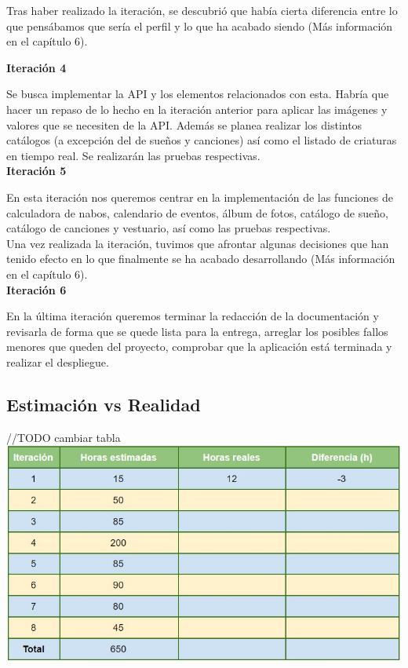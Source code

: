 Tras haber realizado la iteración, se descubrió que había cierta diferencia entre lo que pensábamos que sería el perfil y lo que ha acabado siendo (Más información en el capítulo 6).\\

\clearpage

\textbf{Iteración 4}

Se busca implementar la API y los elementos relacionados con esta. Habría que hacer un repaso de lo hecho en la iteración anterior para aplicar las imágenes y valores que se necesiten de la API. Además se planea realizar los distintos catálogos (a excepción del de sueños y canciones) así como el listado de criaturas en tiempo real. Se realizarán las pruebas respectivas.\\

\textbf{Iteración 5}

En esta iteración nos queremos centrar en la implementación de las funciones de calculadora de nabos, calendario de eventos, álbum de fotos, catálogo de sueño, catálogo de canciones y vestuario, así como las pruebas respectivas.\\

Una vez realizada la iteración, tuvimos que afrontar algunas decisiones que han tenido efecto en lo que finalmente se ha acabado desarrollando (Más información en el capítulo 6).\\

\textbf{Iteración 6}

En la última iteración queremos terminar la redacción de la documentación y revisarla de forma que se quede lista para la entrega, arreglar los posibles fallos menores que queden del proyecto, comprobar que la aplicación está terminada y realizar el despliegue.\\

\subsection{Estimación vs Realidad}

//TODO cambiar tabla
\includegraphics[width=\textwidth]{img/cap4/analisistiempo.jpg}

